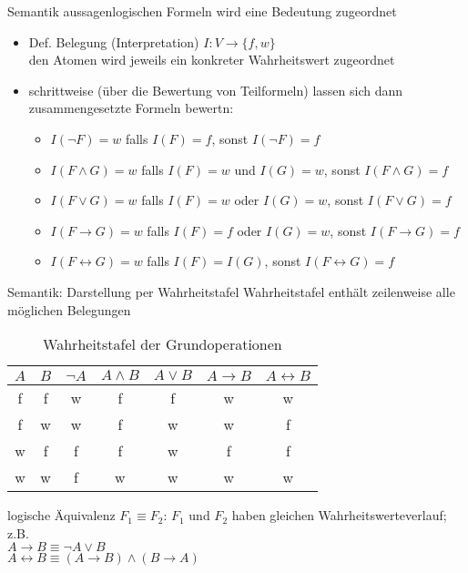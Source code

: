 \begin{frame}{Semantik}
	aussagenlogischen Formeln wird eine Bedeutung zugeordnet
	\begin{itemize}
		\item Def. Belegung (Interpretation) $I: V \rightarrow \{f, w\}$\\ den Atomen wird jeweils ein konkreter Wahrheitswert zugeordnet
		\item schrittweise (über die Bewertung von Teilformeln) lassen sich dann zusammengesetzte Formeln bewertn:
		\begin{itemize}
			\item $I(\neg F)=w$ falls $I(F)=f$, sonst $I(\neg F)=f$
			\item $I(F \land G)=w$ falls $I(F)=w$ und $I(G)=w$, sonst $I(F \land G)=f$
			\item $I(F \lor G)=w$ falls $I(F)=w$ oder $I(G)=w$, sonst $I(F \lor G)=f$
			\item $I(F \rightarrow G)=w$ falls $I(F)=f$ oder $I(G)=w$, sonst $I(F \rightarrow G)=f$
			\item $I(F \leftrightarrow G)=w$ falls $I(F)=I(G)$, sonst $I(F \leftrightarrow G)=f$
		\end{itemize}
	\end{itemize}
\end{frame}

\begin{frame}{Semantik: Darstellung per Wahrheitstafel}
	Wahrheitstafel enthält zeilenweise alle möglichen Belegungen
	\begin{table}
		\centering
			\begin{tabular}{|c|c|c|c|c|c|c|}
				\hline
				$A$ & $B$ & $\neg A$ & $A \land B$ & $A \lor B$ & $A \rightarrow B$ & $A \leftrightarrow B$ \\
				\hline
				f & f & w & f & f & w & w \\
				\hline
				f & w & w & f & w & w & f \\
				\hline
				w & f & f & f & w & f & f \\
				\hline
				w & w & f & w & w & w & w \\
				\hline
			\end{tabular}
			\caption{Wahrheitstafel der Grundoperationen}
		\end{table}
		logische Äquivalenz $F_1 \equiv F_2$: $F_1$ und $F_2$ haben gleichen Wahrheitswerteverlauf; z.B.\\
		$A \rightarrow B \equiv \neg A \lor B$\\
		$A \leftrightarrow B \equiv (A \rightarrow B) \land (B \rightarrow A)$
\end{frame}

